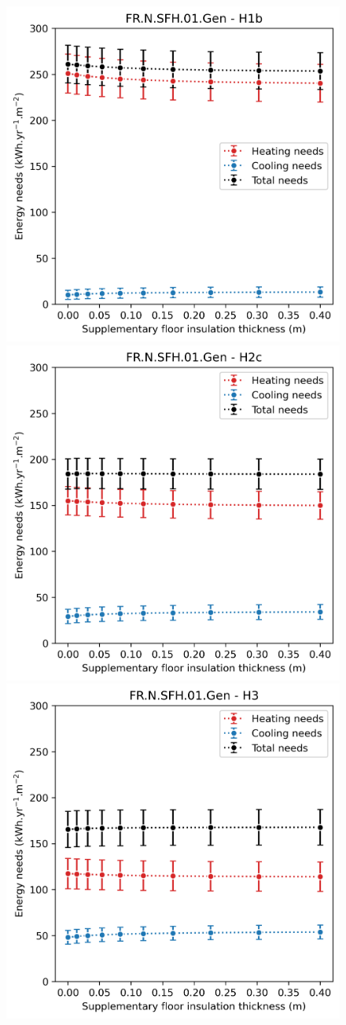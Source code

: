 \documentclass[11pt]{article}
\begin{document}
            \begin{figure}[ht]
                \centering
                \includegraphics[width=0.32\columnwidth]{figures/floor_FR.N.SFH.01.Gen_H1b_conventionnel_th-bce_2020_2000-2020.png}
                \includegraphics[width=0.32\columnwidth]{figures/floor_FR.N.SFH.01.Gen_H2c_conventionnel_th-bce_2020_2000-2020.png}
                \includegraphics[width=0.32\columnwidth]{figures/floor_FR.N.SFH.01.Gen_H3_conventionnel_th-bce_2020_2000-2020.png}\\

\end{figure}
\end{document}
